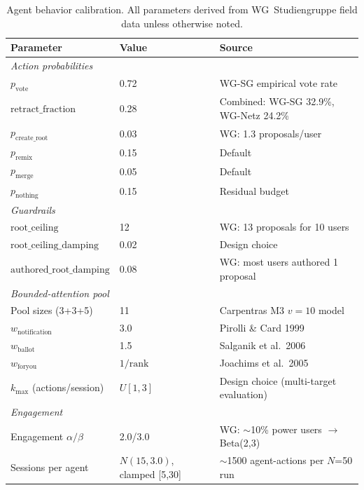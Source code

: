 \documentclass[a4paper, 12pt, twoside]{iviathesis}
\begin{document}
\begin{table}[ht]
\centering
\caption{Agent behavior calibration. All parameters derived from WG~Studiengruppe field data unless otherwise noted.}
\label{tab:sim-calibration}
\small
\begin{tabular}{l l l}
\toprule
\textbf{Parameter} & \textbf{Value} & \textbf{Source} \\
\midrule
\multicolumn{3}{l}{\textit{Action probabilities}} \\
$p_{\text{vote}}$ & 0.72 & WG-SG empirical vote rate \\
$\text{retract\_fraction}$ & 0.28 & Combined: WG-SG 32.9\%, WG-Netz 24.2\% \\
$p_{\text{create\_root}}$ & 0.03 & WG: 1.3 proposals/user \\
$p_{\text{remix}}$ & 0.15 & Default \\
$p_{\text{merge}}$ & 0.05 & Default \\
$p_{\text{nothing}}$ & 0.15 & Residual budget \\
\midrule
\multicolumn{3}{l}{\textit{Guardrails}} \\
$\text{root\_ceiling}$ & 12 & WG: 13 proposals for 10 users \\
$\text{root\_ceiling\_damping}$ & 0.02 & Design choice \\
$\text{authored\_root\_damping}$ & 0.08 & WG: most users authored 1 proposal \\
\midrule
\multicolumn{3}{l}{\textit{Bounded-attention pool}} \\
Pool sizes (3+3+5) & 11 & Carpentras M3 $v=10$ model \\
$w_{\text{notification}}$ & 3.0 & Pirolli \& Card 1999 \\
$w_{\text{ballot}}$ & 1.5 & Salganik et al.\ 2006 \\
$w_{\text{foryou}}$ & $1/\text{rank}$ & Joachims et al.\ 2005 \\
$k_{\max}$ (actions/session) & $U[1, 3]$ & Design choice (multi-target evaluation) \\
\midrule
\multicolumn{3}{l}{\textit{Engagement}} \\
Engagement $\alpha/\beta$ & 2.0/3.0 & WG: $\sim$10\% power users $\to$ Beta(2,3) \\
Sessions per agent & $N(15, 3.0)$, clamped [5,30] & $\sim$1500 agent-actions per $N$=50 run \\
\bottomrule
\end{tabular}
\end{table}
\end{document}
